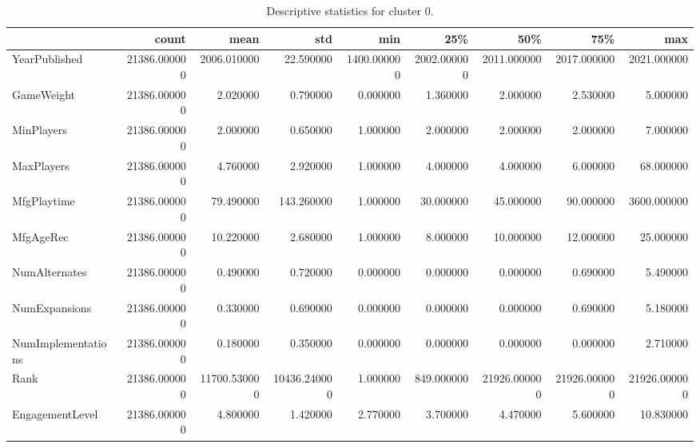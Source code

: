 \begin{table}
\caption{Descriptive statistics for cluster 0.}
\label{tab:cluster_0_describe}
\begin{tabular}{lrrrrrrrr}
\toprule
 & count & mean & std & min & 25\% & 50\% & 75\% & max \\
\midrule
YearPublished & 21386.000000 & 2006.010000 & 22.590000 & 1400.000000 & 2002.000000 & 2011.000000 & 2017.000000 & 2021.000000 \\
GameWeight & 21386.000000 & 2.020000 & 0.790000 & 0.000000 & 1.360000 & 2.000000 & 2.530000 & 5.000000 \\
MinPlayers & 21386.000000 & 2.000000 & 0.650000 & 1.000000 & 2.000000 & 2.000000 & 2.000000 & 7.000000 \\
MaxPlayers & 21386.000000 & 4.760000 & 2.920000 & 1.000000 & 4.000000 & 4.000000 & 6.000000 & 68.000000 \\
MfgPlaytime & 21386.000000 & 79.490000 & 143.260000 & 1.000000 & 30.000000 & 45.000000 & 90.000000 & 3600.000000 \\
MfgAgeRec & 21386.000000 & 10.220000 & 2.680000 & 1.000000 & 8.000000 & 10.000000 & 12.000000 & 25.000000 \\
NumAlternates & 21386.000000 & 0.490000 & 0.720000 & 0.000000 & 0.000000 & 0.000000 & 0.690000 & 5.490000 \\
NumExpansions & 21386.000000 & 0.330000 & 0.690000 & 0.000000 & 0.000000 & 0.000000 & 0.690000 & 5.180000 \\
NumImplementations & 21386.000000 & 0.180000 & 0.350000 & 0.000000 & 0.000000 & 0.000000 & 0.000000 & 2.710000 \\
Rank & 21386.000000 & 11700.530000 & 10436.240000 & 1.000000 & 849.000000 & 21926.000000 & 21926.000000 & 21926.000000 \\
EngagementLevel & 21386.000000 & 4.800000 & 1.420000 & 2.770000 & 3.700000 & 4.470000 & 5.600000 & 10.830000 \\
\bottomrule
\end{tabular}
\end{table}
